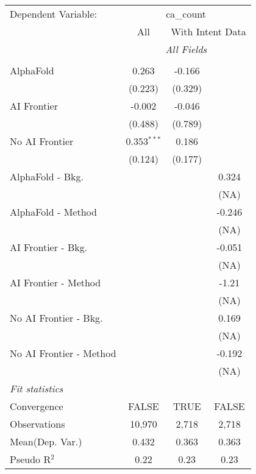 \begingroup
\centering
\begin{tabular}{lccc}
   \tabularnewline \midrule \midrule
   Dependent Variable: & \multicolumn{3}{c}{ca\_count}\\
 & \multicolumn{1}{c}{All} & \multicolumn{2}{c}{With Intent Data} \\
\cmidrule(lr){2-2} \cmidrule(lr){3-4}
 & \multicolumn{3}{c}{\textit{All Fields}} \\ \\
   AlphaFold               & 0.263         & -0.166  &   \\   
                           & (0.223)       & (0.329) &   \\   
   AI Frontier             & -0.002        & -0.046  &   \\   
                           & (0.488)       & (0.789) &   \\   
   No AI Frontier          & 0.353$^{***}$ & 0.186   &   \\   
                           & (0.124)       & (0.177) &   \\   
   AlphaFold - Bkg.        &               &         & 0.324\\   
                           &               &         & (NA)\\   
   AlphaFold - Method      &               &         & -0.246\\   
                           &               &         & (NA)\\   
   AI Frontier - Bkg.      &               &         & -0.051\\   
                           &               &         & (NA)\\   
   AI Frontier - Method    &               &         & -1.21\\   
                           &               &         & (NA)\\   
   No AI Frontier - Bkg.   &               &         & 0.169\\   
                           &               &         & (NA)\\   
   No AI Frontier - Method &               &         & -0.192\\   
                           &               &         & (NA)\\   
   \midrule
   \emph{Fit statistics}\\
   Convergence             &FALSE          & TRUE    & FALSE\\  
   Observations            & 10,970        & 2,718   & 2,718\\  
Mean(Dep. Var.) & 0.432 & 0.363 & 0.363 \\
   Pseudo R$^2$            & 0.22          & 0.23    & 0.23\\  
   

\end{tabular}
